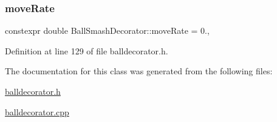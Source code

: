 \subsubsection{\texorpdfstring{move\+Rate}{moveRate}}
{\footnotesize\ttfamily constexpr double Ball\+Smash\+Decorator\+::move\+Rate = 0.\hspace{0.3cm}{\ttfamily [static]}, {\ttfamily [protected]}}



Definition at line 129 of file balldecorator.\+h.



The documentation for this class was generated from the following files\+:\begin{DoxyCompactItemize}
\item 
\mbox{\hyperlink{balldecorator_8h}{balldecorator.\+h}}\item 
\mbox{\hyperlink{balldecorator_8cpp}{balldecorator.\+cpp}}\end{DoxyCompactItemize}
